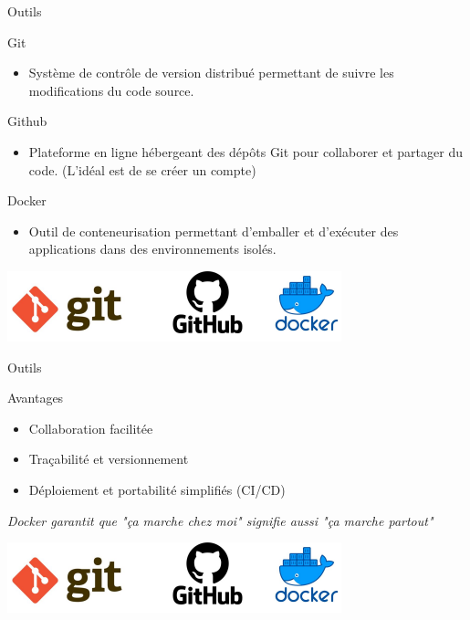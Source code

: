 \documentclass[12pt, handout]{beamer}
\begin{document}
\begin{frame}{Outils}
\begin{block}{Git}
\begin{itemize}
\item Système de contrôle de version distribué permettant de suivre les modifications du code source.
\end{itemize}
\end{block}

\begin{exampleblock}{Github}
\begin{itemize}
\item  Plateforme en ligne hébergeant des dépôts Git pour collaborer et partager du code. (L'idéal est de se créer un compte)
\end{itemize}
\end{exampleblock}

\begin{alertblock}{Docker}
\begin{itemize}
\item Outil de conteneurisation permettant d’emballer et d'exécuter des applications dans des environnements isolés.
\end{itemize}
\end{alertblock}

\begin{center}
\includegraphics[scale=0.7]{./ressource/logo.png}
\end{center}

\end{frame}


\begin{frame}{Outils}

\begin{block}{Avantages}
\begin{itemize}
\item Collaboration facilitée 
\item Traçabilité et versionnement 
\item Déploiement et portabilité simplifiés  (CI/CD)
\end{itemize}
\end{block}
\textit{Docker garantit que "ça marche chez moi" signifie aussi "ça marche partout"}

\begin{center}
\includegraphics[scale=0.7]{./ressource/logo.png}
\end{center}

\end{frame}
\end{document}
